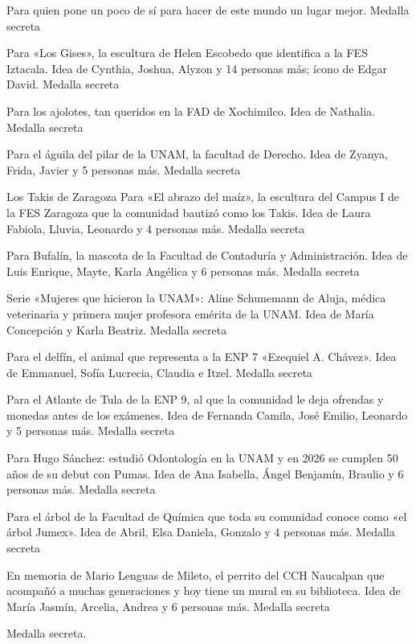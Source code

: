 \begin{description}[leftmargin=1.4cm, style=nextline]
  \item[GR4N1T0] Para quien pone un poco de sí para hacer de este mundo un lugar mejor. Medalla secreta
  \item[G1S3S] Para «Los Gises», la escultura de Helen Escobedo que identifica a la FES Iztacala. Idea de Cynthia, Joshua, Alyzon y 14 personas más; ícono de Edgar David. Medalla secreta
  \item[4XOLOT] Para los ajolotes, tan queridos en la FAD de Xochimilco. Idea de Nathalia. Medalla secreta
  \item[AGU1LA] Para el águila del pilar de la UNAM, la facultad de Derecho. Idea de Zyanya, Frida, Javier y 5 personas más. Medalla secreta
  \item[T4K1S] Los Takis de Zaragoza Para «El abrazo del maíz», la escultura del Campus I de la FES Zaragoza que la comunidad bautizó como los Takis. Idea de Laura Fabiola, Lluvia, Leonardo y 4 personas más. Medalla secreta
  \item[BUF4L1N] Para Bufalín, la mascota de la Facultad de Contaduría y Administración. Idea de Luis Enrique, Mayte, Karla Angélica y 6 personas más. Medalla secreta
  \item[4L1N3] Serie «Mujeres que hicieron la UNAM»: Aline Schunemann de Aluja, médica veterinaria y primera mujer profesora emérita de la UNAM. Idea de María Concepción y Karla Beatriz. Medalla secreta
  \item[D3LF1N] Para el delfín, el animal que representa a la ENP 7 «Ezequiel A. Chávez». Idea de Emmanuel, Sofía Lucrecia, Claudia e Itzel. Medalla secreta
  \item[T0T3M] Para el Atlante de Tula de la ENP 9, al que la comunidad le deja ofrendas y monedas antes de los exámenes. Idea de Fernanda Camila, José Emilio, Leonardo y 5 personas más. Medalla secreta
  \item[HUG0L] Para Hugo Sánchez: estudió Odontología en la UNAM y en 2026 se cumplen 50 años de su debut con Pumas. Idea de Ana Isabella, Ángel Benjamín, Braulio y 6 personas más. Medalla secreta
  \item[4RB0LJUM3X] Para el árbol de la Facultad de Química que toda su comunidad conoce como «el árbol Jumex». Idea de Abril, Elsa Daniela, Gonzalo y 4 personas más. Medalla secreta
  \item[M1L3T0] En memoria de Mario Lenguas de Mileto, el perrito del CCH Naucalpan que acompañó a muchas generaciones y hoy tiene un mural en su biblioteca. Idea de María Jasmín, Arcelia, Andrea y 6 personas más. Medalla secreta
  \item[V4MP1RO] Medalla secreta.

\end{description}
